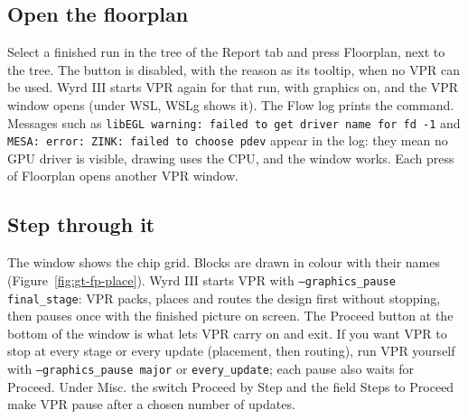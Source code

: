 \documentclass[11pt]{article}
\newcommand{\ui}[1]{\textsf{#1}}
\newcommand{\cmd}[1]{\texttt{#1}}
\begin{document}
\subsection{Open the floorplan}\label{sec:fp-open}

Select a finished run in the tree of the \ui{Report} tab and press \ui{Floorplan}, next to the tree. The button is disabled, with the
reason as its tooltip, when no VPR can be used. Wyrd III starts VPR again for that run, with graphics on, and the VPR window opens
(under WSL, WSLg shows it). The \ui{Flow} log prints the command. Messages such as
\cmd{libEGL warning: failed to get driver name for fd -1} and \cmd{MESA: error: ZINK: failed to choose pdev} appear in the log: they
mean no GPU driver is visible, drawing uses the CPU, and the window works. Each press of \ui{Floorplan} opens another VPR window.

\subsection{Step through it}\label{sec:fp-step}

The window shows the chip grid. Blocks are drawn in colour with their names (Figure~\ref{fig:gt-fp-place}). Wyrd III starts VPR with
\cmd{--graphics\_pause final\_stage}: VPR packs, places and routes the design first without stopping, then pauses once with the
finished picture on screen. The \ui{Proceed} button at the bottom of the window is what lets VPR carry on and exit. If you want VPR to
stop at every stage or every update (placement, then routing), run VPR yourself with \cmd{--graphics\_pause major} or
\cmd{every\_update}; each pause also waits for \ui{Proceed}. Under \ui{Misc.} the switch \ui{Proceed by Step} and the field
\ui{Steps to Proceed} make VPR pause after a chosen number of updates.
\end{document}
